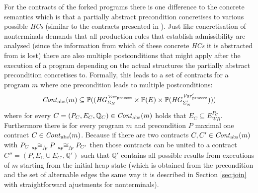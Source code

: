 	For the contracts of the forked programs there is one difference to the
	concrete semantics which is that a partially abstract precondition
	concretises to various possible \emph{\acp{HC}} (similar to the contracts
	presented in \cite{ProcedureSummaries}). Just like concretisation
	of nonterminals demands that all production rules that establish
	admissibility are analysed (since the information from which of these
	concrete \emph{\acp{HC}} it is abstracted from is lost) there are also
	multiple postconditions that might apply after the execution of a program
	depending on the actual structures the partially abstract precondition
	concretises to. Formally, this leads to a set of contracts for a program $m$
	where one precondition leads to multiple postconditions:
	\begin{equation*}
		\mathit{Cont}_{\text{abs}}(m)\subseteq
		\mathbb{P}((\mathit{HG}_{\Sigma_{N}}^{\mathit{Var}_{\text{process}}}\times\mathbb{P}(E)\times
		\mathbb{P}(\mathit{HG}^{\mathit{Var}_{\text{process}}'}_{\Sigma_{N}'})))
	\end{equation*}
	where for every $C = (P_{C}, E_{C}, \mathbb{Q}_{C})\in\mathit{Cont}_{\text{abs}}(m)$
	holds that $E_{C}\subseteq E_{\mathit{WR}}^{P_{C}}$.
	Furthermore there is for every program $m$ and
	precondition $P$ maximal one contract $C\in\mathit{Cont}_{\text{abs}}(m)$. Because
	if there are two contracts $C,C'\in\mathit{Cont}_{\text{abs}}(m)$ with
	$P_C\afiso P\afiso P_{C'}$ then those contracts can be united to a contract
	$C'' = (P, E_{C}\cup E_{C'}, \mathbb{Q}')$ such that $\mathbb{Q}'$ contains
	all possible results from executions of $m$ starting from the initial
	heap state (which is obtained from the precondition and the set of
	alternable edges the same way it is described in Section \ref{sec:join}
	with straightforward ajustments for nonterminals).

